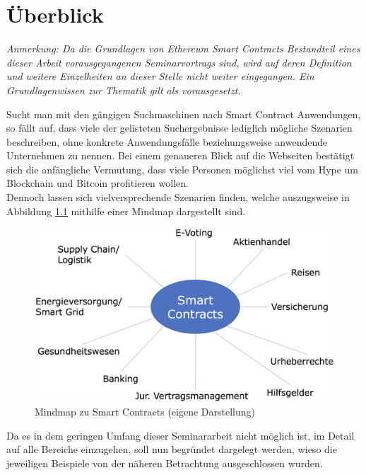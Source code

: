 \chapter{Überblick}
\label{chap:Ueberblick}

\textit{Anmerkung: Da die Grundlagen von Ethereum Smart Contracts Bestandteil eines dieser Arbeit vorausgegangenen Seminarvortrags sind, wird auf deren Definition und weitere Einzelheiten an dieser Stelle nicht weiter eingegangen. Ein Grundlagenwissen zur Thematik gilt als vorausgesetzt.}

Sucht man mit den gängigen Suchmaschinen nach Smart Contract Anwendungen, so fällt auf, dass viele der gelisteten Suchergebnisse lediglich mögliche Szenarien beschreiben, ohne konkrete Anwendungsfälle beziehungsweise anwendende Unternehmen zu nennen. Bei einem genaueren Blick auf die Webseiten bestätigt sich die anfängliche Vermutung, dass viele Personen möglichst viel vom Hype um Blockchain und Bitcoin profitieren wollen. \\
Dennoch lassen sich vielversprechende Szenarien finden, welche auszugsweise in Abbildung \ref{fig:mindmap} mithilfe einer Mindmap dargestellt sind.

\begin{figure}[h!]
  \centering
  \includegraphics[width=\textwidth]{Bilder/Mindmap.png}
  \caption[Mindmap zu Smart Contracts]{Mindmap zu Smart Contracts (eigene Darstellung)}
  \label{fig:mindmap}
\end{figure}

Da es in dem geringen Umfang dieser Seminararbeit nicht möglich ist, im Detail auf alle Bereiche einzugehen, soll nun begründet dargelegt werden, wieso die jeweiligen Beispiele von der näheren Betrachtung ausgeschlossen wurden.\\ 

